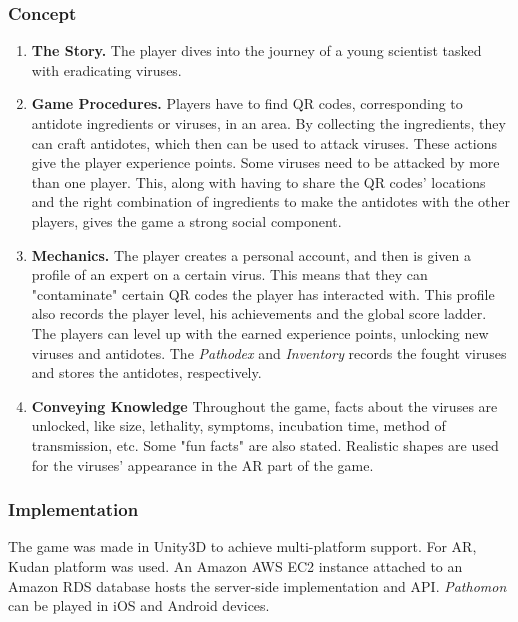\documentclass[runningheads]{llncs}
\begin{document}
\subsubsection{Concept}
\begin{enumerate}
    \item \textbf{The Story.} The player dives into the journey of a young scientist tasked with eradicating viruses.
    \item \textbf{Game Procedures.} Players have to find QR codes, corresponding to antidote ingredients or viruses, in an area. By collecting the ingredients, they can craft antidotes, which then can be used to attack viruses. These actions give the player experience points. Some viruses need to be attacked by more than one player. This, along with having to share the QR codes' locations and the right combination of ingredients to make the antidotes with the other players, gives the game a strong social component.
    \item \textbf{Mechanics.} The player creates a personal account, and then is given a profile of an expert on a certain virus. This means that they can "contaminate" certain QR codes the player has interacted with. This profile also records the player level, his achievements and the global score ladder. The players can level up with the earned experience points, unlocking new viruses and antidotes. The \textit{Pathodex} and \textit{Inventory} records the fought viruses and stores the antidotes, respectively.
    \item \textbf{Conveying Knowledge} Throughout the game, facts about the viruses are unlocked, like size, lethality, symptoms, incubation time, method of transmission, etc. Some "fun facts" are also stated. Realistic shapes are used for the viruses' appearance in the AR part of the game.
\end{enumerate}

\subsubsection{Implementation}
\par The game was made in Unity3D to achieve multi-platform support. For AR, Kudan platform was used. An Amazon AWS EC2 instance attached to an Amazon RDS database hosts the server-side implementation and API. \textit{Pathomon} can be played in iOS and Android devices.
\end{document}
